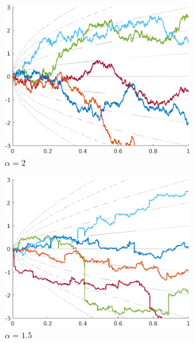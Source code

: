 \begin{itemize}
        \begin{figure}[!ht]
            \begin{subfigure}{0.5\textwidth}
                \centering
                \includegraphics[width = 0.9\textwidth]{1 - low-noise PiC models/2 - FEM vs PiC coupling/2 - PiC/images/alpha = 2.0.png}
                \caption{$\alpha  =  2$}
            \end{subfigure}%
            \begin{subfigure}{0.5\textwidth}
                \centering
                \includegraphics[width = 0.9\textwidth]{1 - low-noise PiC models/2 - FEM vs PiC coupling/2 - PiC/images/alpha = 1.5.png}
                \caption{$\alpha  =  1.5$}
            \end{subfigure}
            \begin{subfigure}{0.5\textwidth}

\end{subfigure}
\end{figure}
\end{itemize}
